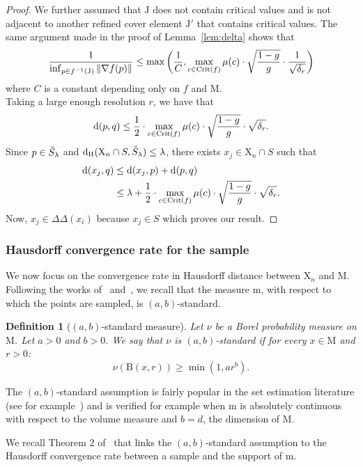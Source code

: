 \documentclass[pdflatex,sn-mathphys-ay]{sn-jnl}%
\newtheorem{definition}{Definition}
\newcommand{\man}{\mathrm{M}}
\newcommand{\sample}{\mathrm{X}}
\newcommand{\mes}{\mathrm{m}}
\newcommand{\dis}{\mathrm{d}}
\newcommand{\critic}{{\mathrm {Crit}}}
\newcommand{\haus}{{\mathrm {d_H}}}
\newcommand{\ball}{{\mathrm {B}}}
\newcommand{\DD}{\Delta\!\!\!\!\Delta}
\newcommand{\coverwidth}{\change{\delta_r}}
\newcommand{\preim}[2]{#1^{-1}(#2)}
\newcommand{\change}[1]{\noindent #1}
\theoremstyle{thmstyleone}%
\begin{document}
\begin{proof}
We further assumed that $\mathrm{J}$ does not contain critical values and is not adjacent to another refined cover element $\mathrm{J}'$ that contains critical values. The same argument made in the proof of Lemma~\ref{lem:delta} shows that
$$\frac{1}{\inf_{p\in \preim{f}{\mathrm{J}}}\Vert\nabla f(p)\Vert}\leq \max\left(\frac{1}{C},\max_{c\in\critic(f)}\mu(c)\cdot\sqrt{\frac{1-g}{g}}\cdot\frac{1}{\sqrt{\coverwidth}}\right)$$
where $C$ is a constant depending only on $f$ and $\man$.\\
Taking a large enough resolution $r$, we have that
$$\dis(p,q)\leq\frac{1}{2}\cdot\max_{c\in\critic(f)}\mu(c)\cdot\sqrt{\frac{1-g}{g}}\cdot\sqrt{\coverwidth}.$$
Since $p\in\Tilde{S}_\lambda$ and $\haus(\sample_n\cap S,\Tilde{S}_\lambda)\leq\lambda$, there exists $x_j\in\sample_n\cap S$ such that 
%
\begin{align*}
\dis(x_j,q)&\leq\dis(x_j,p)+\dis(p,q)\\
&\leq \lambda+\frac{1}{2}\cdot\max_{c\in\critic(f)}\mu(c)\cdot\sqrt{\frac{1-g}{g}}\cdot\sqrt{\coverwidth}.
\end{align*}
%
Now, $x_j\in\DD(x_i)$ because $x_j\in S$ which proves our result.
\end{proof}


\subsubsection{Hausdorff convergence rate for the sample}
We now focus on the convergence rate in Hausdorff distance between $\sample_n$ and $\man$. Following the works of~\citet{chazal2014convergence} and~\citet{carriere2018statistical}, we recall that the measure $\mes$, with respect to which the points are sampled, is $(a,b)$-standard.  

\begin{definition}[\change{$(a,b)$-standard measure}]
Let $\nu$ be a Borel probability measure on $\man$. Let $a>0$ and $b>0$.
We say that $\nu$ is $(a,b)$-standard if for every $x\in\man$ and $r>0$:
$$\nu\left(\ball\left(x,r\right)\right)\geq \min\left(1,ar^b\right).$$
\end{definition}

 The $(a,b)$-standard assumption is fairly popular in the set estimation literature (see for example~\citet{cuevas2009set}) and is verified for example when $\mes$ is absolutely continuous with respect to the volume measure and $b=d$, the dimension of $\man$.
 
We recall Theorem 2 of~\citet{chazal2014convergence} that links the $(a,b)$-standard assumption to the Hausdorff convergence rate between a sample and the support of $\mes$.
 
\end{document}
